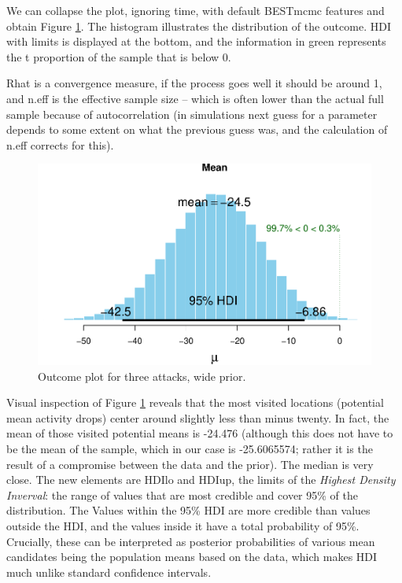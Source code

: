\documentclass[10pt,]{scrartcl}
\begin{document}
We can collapse the plot, ignoring time, with default \textsf{BESTmcmc}
features and obtain Figure \ref{fig:mw3plot}. The histogram illustrates
the distribution of the outcome. HDI with limits is displayed at the
bottom, and the information in green represents the t proportion of the
sample that is below 0.

Rhat is a convergence measure, if the process goes well it should be
around 1, and \textsf{n.eff} is the effective sample size -- which is
often lower than the actual full sample because of autocorrelation (in
simulations next guess for a parameter depends to some extent on what
the previous guess was, and the calculation of \textsf{n.eff} corrects
for this).

\begin{figure}[h!]

\begin{center}\includegraphics[width=1\linewidth]{redditAnalysisWalkthrough_files/figure-latex/unnamed-chunk-55-1} \end{center}
\caption{Outcome plot for three attacks, wide prior.}
\label{fig:mw3plot}
\end{figure}

Visual inspection of Figure \ref{fig:mw3plot} reveals that the most
visited locations (potential mean activity drops) center around slightly
less than minus twenty. In fact, the mean of those visited potential
means is -24.476 (although this does not have to be the mean of the
sample, which in our case is -25.6065574; rather it is the result of a
compromise between the data and the prior). The median is very close.
The new elements are HDIlo and HDIup, the limits of the
\emph{Highest Density Inverval}: the range of values that are most
credible and cover 95\% of the distribution. The Values within the 95\%
HDI are more credible than values outside the HDI, and the values inside
it have a total probability of 95\%. Crucially, these can be interpreted
as posterior probabilities of various mean candidates being the
population means based on the data, which makes HDI much unlike standard
confidence intervals.
\end{document}
